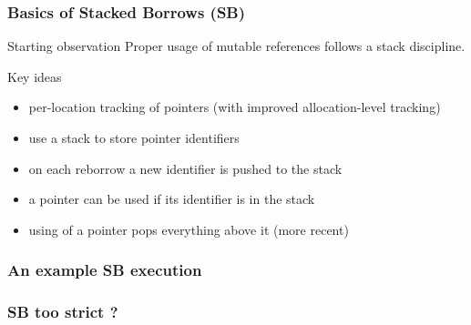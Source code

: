 \begin{frame}
    \frametitle{Basics of Stacked Borrows (SB)}
    \begin{block}{Starting observation}
        Proper usage of mutable references follows a stack discipline.
    \end{block}
    \begin{block}{Key ideas}
        \begin{itemize}
            \item per-location tracking of pointers (with improved allocation-level tracking)
            \item use a stack to store pointer identifiers
            \item on each reborrow a new identifier is pushed to the stack
            \item a pointer can be used if its identifier is in the stack
            \item using of a pointer pops everything above it (more recent)
        \end{itemize}
    \end{block}
\end{frame}

\begin{frame}
    \frametitle{An example SB execution}
\end{frame}

\begin{frame}
    \frametitle{SB too strict ?}
\end{frame}

